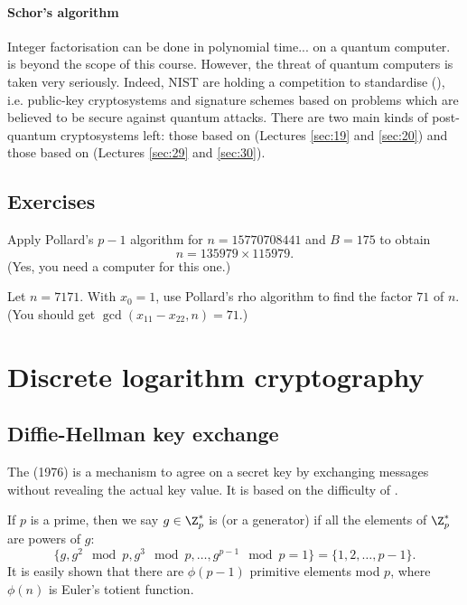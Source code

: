 \documentclass[a4paper, 11pt, openany]{book}
\begin{document}
\paragraph{Schor's algorithm}
Integer factorisation can be done in polynomial time... on a quantum computer.  is beyond the scope of this course. However, the threat of quantum computers is taken very seriously. Indeed, NIST are holding a competition to standardise  (), i.e. public-key cryptosystems and signature schemes based on problems which are believed to be secure against quantum attacks. There are two main kinds of post-quantum cryptosystems left: those based on  (Lectures \ref{sec:19} and \ref{sec:20}) and those based on  (Lectures \ref{sec:29} and \ref{sec:30}).

\subsection{Exercises}

\begin{exercise}
Apply Pollard's $p-1$ algorithm for $n = 15770708441$ and $B = 175$ to obtain
\[
    n = 135979 \times 115979.
\]
(Yes, you need a computer for this one.)
\end{exercise}


\begin{exercise}
Let $n = 7171$. With $x_0 = 1$, use Pollard's rho algorithm to find the factor $71$ of $n$. (You should get $\gcd(x_{11} - x_{22}, n) = 71$.)
\end{exercise}




\section{Discrete logarithm cryptography}
\label{sec:16}

\subsection{Diffie-Hellman key exchange}

The  (1976) is a mechanism to agree on a secret key by exchanging messages without revealing the actual key value. It is based on the difficulty of .

If $p$ is a prime, then we say $g \in \Z_p^*$ is  (or a generator) if all the elements of $\Z_p^*$ are powers of $g$:
\[
    \{g, g^2 \mod p, g^3 \mod p, \dots, g^{p-1} \mod p = 1  \} = \{1, 2, \dots, p-1 \}.
\]
It is easily shown that there are $\phi(p-1)$ primitive elements mod $p$, where $\phi(n)$ is Euler's totient function.
\end{document}
